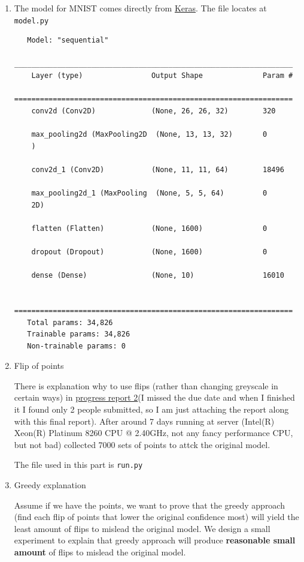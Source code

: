 \documentclass[
]{article}
\begin{document}
\begin{enumerate}
\def\labelenumi{\arabic{enumi}.}
\item
  The model for MNIST comes directly from
  \href{https://keras.io/examples/vision/mnist_convnet/}{Keras}. The
  file locates at \texttt{model.py}

\begin{verbatim}
   Model: "sequential"
   _________________________________________________________________
    Layer (type)                Output Shape              Param #
   =================================================================
    conv2d (Conv2D)             (None, 26, 26, 32)        320

    max_pooling2d (MaxPooling2D  (None, 13, 13, 32)       0
    )

    conv2d_1 (Conv2D)           (None, 11, 11, 64)        18496

    max_pooling2d_1 (MaxPooling  (None, 5, 5, 64)         0
    2D)

    flatten (Flatten)           (None, 1600)              0

    dropout (Dropout)           (None, 1600)              0

    dense (Dense)               (None, 10)                16010

   =================================================================
   Total params: 34,826
   Trainable params: 34,826
   Non-trainable params: 0
\end{verbatim}
\item
  Flip of points

  There is explanation why to use flips (rather than changing greyscale
  in certain ways) in \href{progress.md}{progress report 2}(I missed the
  due date and when I finished it I found only 2 people submitted, so I
  am just attaching the report along with this final report). After
  around 7 days running at server (Intel(R) Xeon(R) Platinum 8260 CPU @
  2.40GHz, not any fancy performance CPU, but not bad) collected 7000
  sets of points to attck the original model.

  The file used in this part is \texttt{run.py}
\item
  Greedy explanation

  Assume if we have the points, we want to prove that the greedy
  approach (find each flip of points that lower the original confidence
  most) will yield the least amount of flips to mislead the original
  model. We design a small experiment to explain that greedy approach
  will produce \textbf{reasonable small amount} of flips to mislead the
  original model.


\end{enumerate}
\end{document}
